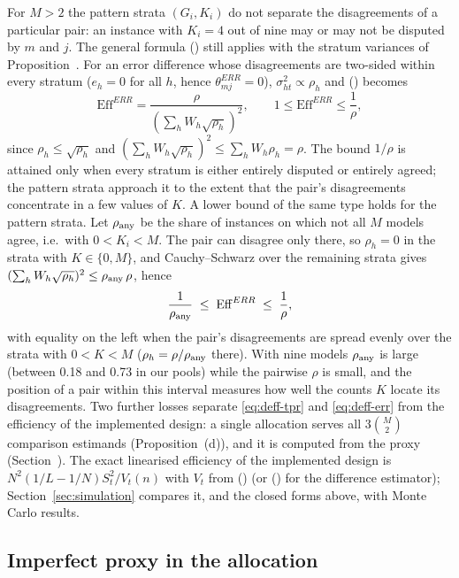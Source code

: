 For $M>2$ the pattern strata $(G_i,K_i)$ do not separate the disagreements of a particular pair:
an instance with $K_i=4$ out of nine may or may not be disputed by $m$ and $j$. The general
formula () still applies with the stratum variances of
Proposition~. For an error difference whose disagreements are two-sided within
every stratum ($e_h=0$ for all $h$, hence $\theta^{ERR}_{mj}=0$), $\sigma^2_{ht}\propto\rho_h$
and () becomes
\begin{equation}\label{eq:deff-mixed}
\mathrm{Eff}^{ERR}=\frac{\rho}{(\sum_hW_h\sqrt{\rho_h})^2},\qquad 1\le\mathrm{Eff}^{ERR}\le\frac1\rho,
\end{equation}
since $\rho_h\le\sqrt{\rho_h}$ and $(\sum_hW_h\sqrt{\rho_h})^2\le\sum_hW_h\rho_h=\rho$. The bound $1/\rho$ is
attained only when every stratum is either entirely disputed or entirely agreed; the pattern
strata approach it to the extent that the pair's disagreements concentrate in a few values of
$K$. A lower bound of the same type holds for the pattern strata. Let $\rho_{\rm any}$ be the share
of instances on which not all $M$ models agree, i.e.\ with $0<K_i<M$. The pair can disagree only
there, so $\rho_h=0$ in the strata with $K\in\{0,M\}$, and Cauchy--Schwarz over the remaining strata
gives $(\sum_hW_h\sqrt{\rho_h})^2\le\rho_{\rm any}\,\rho$, hence
\begin{equation}\label{eq:deff-sandwich}
\frac{1}{\rho_{\rm any}}\;\le\;\mathrm{Eff}^{ERR}\;\le\;\frac{1}{\rho},
\end{equation}
with equality on the left when the pair's disagreements are spread evenly over the strata with
$0<K<M$ ($\rho_h=\rho/\rho_{\rm any}$ there). With nine models $\rho_{\rm any}$ is large (between
0.18 and 0.73 in our pools) while the pairwise $\rho$ is small, and the position of a pair within
this interval measures how well the counts $K$ locate its disagreements. Two further losses separate \eqref{eq:deff-tpr} and \eqref{eq:deff-err} from the efficiency of the implemented
design: a single allocation serves all $3\binom M2$ comparison estimands
(Proposition~(d)), and it is computed from the proxy
(Section~). The exact linearised efficiency of the implemented design is
$N^2(1/L-1/N)S^2_t/V_t(n)$ with $V_t$ from () (or () for the difference estimator); Section~\ref{sec:simulation}
compares it, and the closed forms above, with Monte Carlo results.

\subsection{Imperfect proxy in the allocation}\label{si:theory-proxy}

